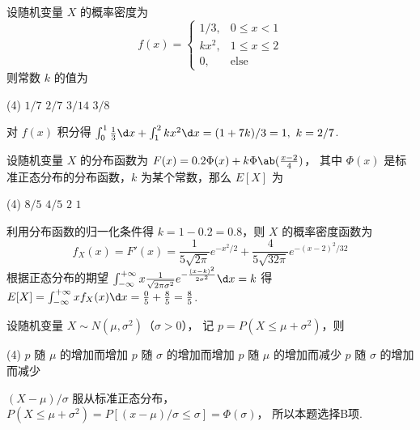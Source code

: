 \begin{problem}
  设随机变量 $X$ 的概率密度为
  \[
    f(x) =
    \begin{cases}
      1/3, & 0 \leq x < 1 \\ k x^2, & 1 \leq x \leq 2 \\ 0, & \text {else}
    \end{cases}
  \]
  则常数 $k$ 的值为
  \begin{tasks}(4)
    \task $1/7$
    \task $2/7$
    \task $3/14$
    \task $3/8$
  \end{tasks}
\end{problem}
\scratch[2ex]
\begin{solution}
  对 $f(x)$ 积分得
  $\int_0^1 \frac13 \d x + \int_1^2 kx^2 \d x = (1 + 7k)/3 = 1,~ k = 2/7$.
\end{solution}

\begin{problem}
  设随机变量 $X$ 的分布函数为 $F(x) = 0.2\Phi(x) + k\Phi\ab(\frac{x-2}{4})$，
  其中 $\Phi(x)$ 是标准正态分布的分布函数，$k$ 为某个常数，那么 $E[X]$ 为
  \begin{tasks}(4)
    \task[\true] $8/5$
    \task $4/5$
    \task $2$
    \task $1$
  \end{tasks}
\end{problem}
\scratch[12ex]
\begin{solution}
  利用分布函数的归一化条件得 $k = 1 - 0.2 = 0.8$，则 $X$ 的概率密度函数为
  \[
    f_X(x) = F'(x) = \frac{1}{5\sqrt{2\pi}} e^{-x^2/2}
                   + \frac{4}{5\sqrt{32\pi}} e^{-(x - 2)^2/32}
  \]
  根据正态分布的期望
  $ \int^{+\infty}_{-\infty} x\frac{1}{\sqrt{2\pi\sigma^2}}
    e^{-\frac{(x - k)^2}{2\sigma^2}} \d x = k$ 得
  $E[X] = \int^{+\infty}_{-\infty} xf_X(x) \d x = \frac05 + \frac85 = \frac85$.
\end{solution}

\begin{problem}
  设随机变量 $X \sim N(\mu,\sigma^2)$（$\sigma > 0$），
  记 $p = P(X \leq \mu + \sigma^2)$，则
  \begin{tasks}(4)
    \task $p$ 随 $\mu$ 的增加而增加
    \task $p$ 随 $\sigma$ 的增加而增加
    \task $p$ 随 $\mu$ 的增加而减少
    \task $p$ 随 $\sigma$ 的增加而减少
  \end{tasks}
\end{problem}
\scratch[2ex]
\begin{solution}
  $(X - \mu)/\sigma$ 服从标准正态分布，
  $P(X \leq \mu + \sigma^2) = P[(x - \mu)/\sigma \leq \sigma] = \Phi(\sigma)$，
  所以本题选择B项.
\end{solution}

